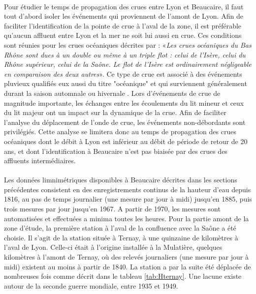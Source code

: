 	\paragraph{} Pour étudier le temps de propagation des crues entre Lyon et Beaucaire, il faut tout d'abord isoler les événements qui proviennent de l'amont de Lyon. Afin de faciliter l'identification de la pointe de crue à l'aval de la zone, il est préférable qu'aucun affluent entre Lyon et la mer ne soit lui aussi en crue. Ces conditions sont réunies pour les crues océaniques décrites par \citet{parde_regime_1919} : «\textit{Les crues océaniques du Bas Rhône sont dues à un double ou même à un triple flot : celui de l'Isère, celui du Rhône supérieur, celui de la Saône. Le flot de l'Isère est ordinairement négligeable en comparaison des deux autres}». Ce type de crue est associé à des événements pluvieux qualifiés eux aussi du titre "océanique" et qui surviennent généralement durant la saison automnale ou hivernale \citep{parde_regime_1925}. Lors d'événements de crue de magnitude importante, les échanges entre les écoulements du lit mineur et ceux du lit majeur ont un impact sur la dynamique de la crue. Afin de faciliter l'analyse du déplacement de l'onde de crue, les événements non-débordants sont privilégiés. Cette analyse se limitera donc au temps de propagation des crues océaniques dont le débit à Lyon est inférieur au débit de période de retour de 20 ans, et dont l'identification à Beaucaire n'est pas biaisée par des crues des affluents intermédiaires. 
	
	\paragraph{} Les données limnimétriques disponibles à Beaucaire décrites dans les sections précédentes consistent en des enregistrements continus de la hauteur d'eau depuis 1816, au pas de temps journalier (une mesure par jour à midi) jusqu'en 1885, puis trois mesures par jour jusqu'en 1967. A partir de 1970, les mesures sont automatisées et effectuées a minima toutes les heures. Pour la partie amont de la zone d'étude, la première station à l'aval de la confluence avec la Saône a été choisie. Il s'agit de la station située à Ternay, à une quinzaine de kilomètres à l'aval de Lyon. Celle-ci était à l'origine installée à la Mulatière, quelques kilomètres à l'amont de Ternay, où des relevés journaliers (une mesure par jour à midi) existent au moins à partir de 1840. La station a par la suite été déplacée de nombreuses fois comme décrit dans le tableau \ref{tab:Hternay}. Une lacune existe autour de la seconde guerre mondiale, entre 1935 et 1949. 
	
